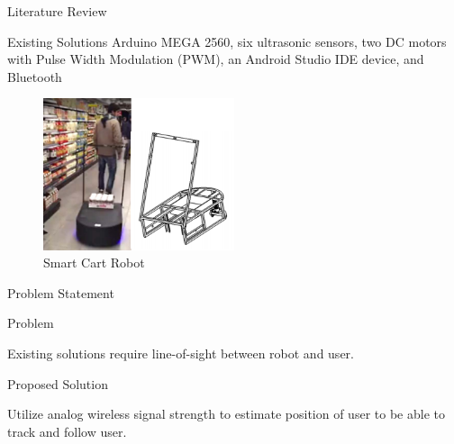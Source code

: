 \documentclass{beamer}
\begin{document}

\begin{frame}{Literature Review}
  \begin{block}{Existing Solutions}
    Arduino MEGA 2560, six ultrasonic sensors, two DC motors with Pulse Width Modulation (PWM), an Android Studio IDE device, and Bluetooth~\cite{Rawashdeh2017-Person}
  \end{block}
    \begin{figure}[b]
        \centering
        \includegraphics[width=0.50\textwidth]{figs/img/SmartCart}
        \caption{Smart Cart Robot}
    \end{figure}
\end{frame}


\begin{frame}{Problem Statement}
  \begin{block}{Problem}
    \begin{LARGE}
      Existing solutions require line-of-sight between robot and user.
    \end{LARGE}
  \end{block}
  \pause
  \begin{block}{Proposed Solution}
    \begin{LARGE}
      Utilize analog wireless signal strength to estimate position of user to be able to track and follow user.
    \end{LARGE}
  \end{block}
\end{frame}

\end{document}
